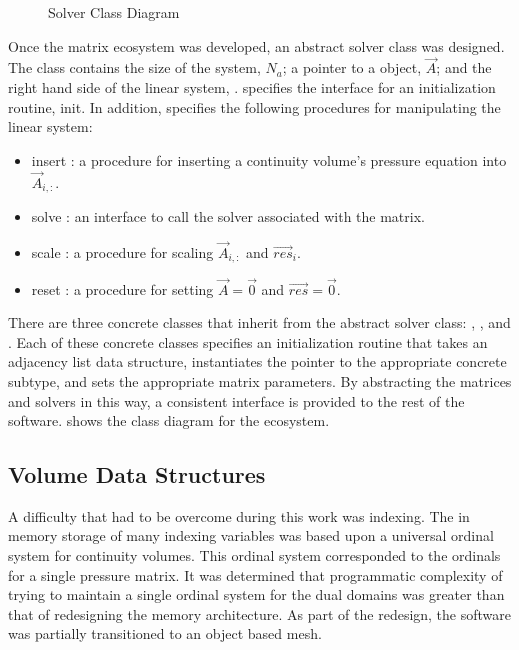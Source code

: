 \begin{figure}[ht!]
\singlespace\centering

\caption{Solver Class Diagram}
\label{fig:solverClassDiagram}
\end{figure}

Once the matrix ecosystem was developed, an abstract solver class was designed.
The  class contains the size of the system, $N_{a}$; a pointer to a  object, $\vec{A}$; and the right hand side of the linear system, .
 specifies the interface for an initialization routine, init.
In addition,  specifies the following procedures for manipulating the linear system:

\begin{itemize}
\item{ insert : a procedure for inserting a continuity volume's pressure equation into $\vec{A}_{i, :}$.}
\item{ solve : an interface to call the solver associated with the matrix.}
\item{ scale : a procedure for scaling $\vec{A}_{i, :}$ and $\vec{res}_{i}$.}
\item{ reset : a procedure for setting $\vec{A} = \vec{0}$ and $\vec{res} = \vec{0}$.}
\end{itemize}

There are three concrete classes that inherit from the abstract solver class: , , and .
Each of these concrete classes specifies an initialization routine that takes an adjacency list data structure, instantiates the  pointer to the appropriate concrete subtype, and sets the appropriate matrix parameters.
By abstracting the matrices and solvers in this way, a consistent interface is provided to the rest of the software.
 shows the class diagram for the  ecosystem.

\subsection{Volume Data Structures}
\label{subsect:domDecompVolumeStructs}

A difficulty that had to be overcome during this work was indexing.
The in memory storage of many indexing variables was based upon a universal ordinal system for continuity volumes.
This ordinal system corresponded to the ordinals for a single pressure matrix.
It was determined that programmatic complexity of trying to maintain a single ordinal system for the dual domains was greater than that of redesigning the memory architecture.
As part of the redesign, the software was partially transitioned to an object based mesh.

